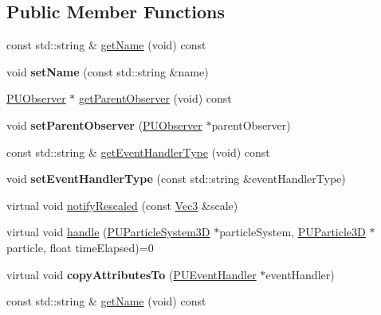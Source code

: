 \subsection*{Public Member Functions}
\begin{DoxyCompactItemize}
\item 
const std\+::string \& \hyperlink{classPUEventHandler_a02dc1ed005744db6c6b6d0a45f34e145}{get\+Name} (void) const
\item 
\mbox{\label{classPUEventHandler_a55a0c096c746bd963fb733eb3e5457ef}} 
void {\bfseries set\+Name} (const std\+::string \&name)
\item 
\hyperlink{classPUObserver}{P\+U\+Observer} $\ast$ \hyperlink{classPUEventHandler_a1934c2484b1127c94fbf235bbb6af892}{get\+Parent\+Observer} (void) const
\item 
\mbox{\label{classPUEventHandler_a0e044260fa91e1f17abce627c4231cac}} 
void {\bfseries set\+Parent\+Observer} (\hyperlink{classPUObserver}{P\+U\+Observer} $\ast$parent\+Observer)
\item 
const std\+::string \& \hyperlink{classPUEventHandler_ae1025b7365621e99b2b8fa257ff4583a}{get\+Event\+Handler\+Type} (void) const
\item 
\mbox{\label{classPUEventHandler_aa3ac7481332d09a96b15ee6b153d68f7}} 
void {\bfseries set\+Event\+Handler\+Type} (const std\+::string \&event\+Handler\+Type)
\item 
virtual void \hyperlink{classPUEventHandler_a3bd376b30698822a875d2c2c9b19075f}{notify\+Rescaled} (const \hyperlink{classVec3}{Vec3} \&scale)
\item 
virtual void \hyperlink{classPUEventHandler_a760172609708c65548dcac364c9b3b9c}{handle} (\hyperlink{classPUParticleSystem3D}{P\+U\+Particle\+System3D} $\ast$particle\+System, \hyperlink{structPUParticle3D}{P\+U\+Particle3D} $\ast$particle, float time\+Elapsed)=0
\item 
\mbox{\label{classPUEventHandler_af69c4c676d68df05f1db6a4b8c258bf0}} 
virtual void {\bfseries copy\+Attributes\+To} (\hyperlink{classPUEventHandler}{P\+U\+Event\+Handler} $\ast$event\+Handler)
\item 
const std\+::string \& \hyperlink{classPUEventHandler_a02dc1ed005744db6c6b6d0a45f34e145}{get\+Name} (void) const
\item 

\end{DoxyCompactItemize}
